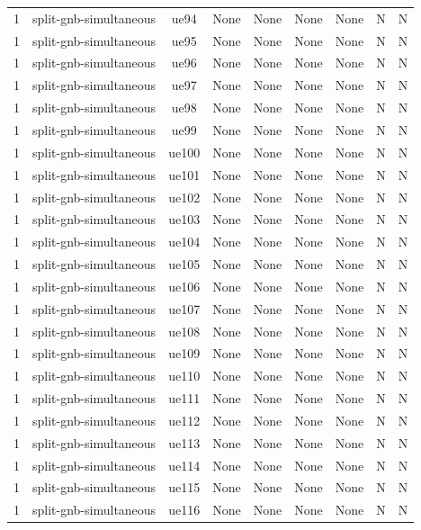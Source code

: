\begin{table}[ht]
\begin{tabular}{|c|c|c|c|c|c|c|c|c|}
1 & split-gnb-simultaneous & ue94 & None & None & None & None & N & N \\
1 & split-gnb-simultaneous & ue95 & None & None & None & None & N & N \\
1 & split-gnb-simultaneous & ue96 & None & None & None & None & N & N \\
1 & split-gnb-simultaneous & ue97 & None & None & None & None & N & N \\
1 & split-gnb-simultaneous & ue98 & None & None & None & None & N & N \\
1 & split-gnb-simultaneous & ue99 & None & None & None & None & N & N \\
1 & split-gnb-simultaneous & ue100 & None & None & None & None & N & N \\
1 & split-gnb-simultaneous & ue101 & None & None & None & None & N & N \\
1 & split-gnb-simultaneous & ue102 & None & None & None & None & N & N \\
1 & split-gnb-simultaneous & ue103 & None & None & None & None & N & N \\
1 & split-gnb-simultaneous & ue104 & None & None & None & None & N & N \\
1 & split-gnb-simultaneous & ue105 & None & None & None & None & N & N \\
1 & split-gnb-simultaneous & ue106 & None & None & None & None & N & N \\
1 & split-gnb-simultaneous & ue107 & None & None & None & None & N & N \\
1 & split-gnb-simultaneous & ue108 & None & None & None & None & N & N \\
1 & split-gnb-simultaneous & ue109 & None & None & None & None & N & N \\
1 & split-gnb-simultaneous & ue110 & None & None & None & None & N & N \\
1 & split-gnb-simultaneous & ue111 & None & None & None & None & N & N \\
1 & split-gnb-simultaneous & ue112 & None & None & None & None & N & N \\
1 & split-gnb-simultaneous & ue113 & None & None & None & None & N & N \\
1 & split-gnb-simultaneous & ue114 & None & None & None & None & N & N \\
1 & split-gnb-simultaneous & ue115 & None & None & None & None & N & N \\
1 & split-gnb-simultaneous & ue116 & None & None & None & None & N & N \\

\end{tabular}
\end{table}

